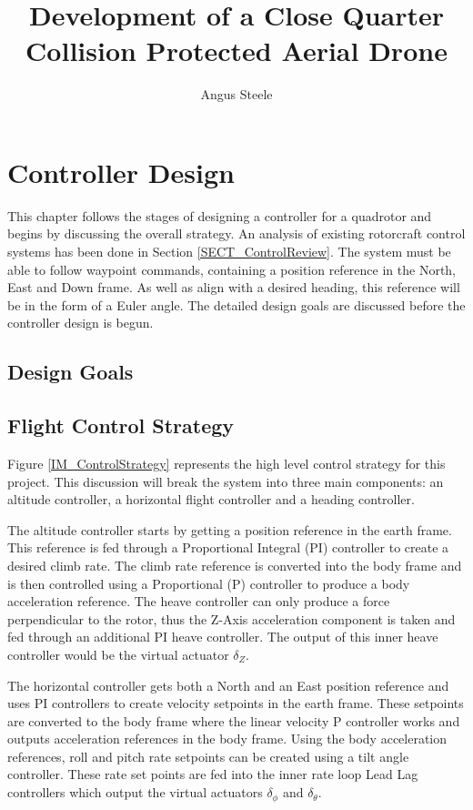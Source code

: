 \documentclass[12pt]{report}
\title{Development of a Close Quarter Collision Protected Aerial Drone}
\author{Angus Steele}
\begin{document}
\chapter{Controller Design}
This chapter follows the stages of designing a controller for a quadrotor and begins by discussing the overall strategy. An analysis of existing rotorcraft control systems has been done in Section \ref{SECT_ControlReview}. The system must be able to follow waypoint commands, containing a position reference in the North, East and Down frame. As well as align with a desired heading, this reference will be in the form of a Euler angle. The detailed design goals are discussed before the controller design is begun.

\section{Design Goals}


\section{Flight Control Strategy}
Figure \ref{IM_ControlStrategy} represents the high level control strategy for this project. This discussion will break the system into three main components: an altitude controller, a horizontal flight controller and a heading controller.	

The altitude controller starts by getting a position reference in the earth frame. This reference is fed through a Proportional Integral (PI) controller to create a desired climb rate. The climb rate reference is converted into the body frame and is then controlled using a Proportional (P) controller to produce a body acceleration reference. The heave controller can only produce a force perpendicular to the rotor, thus the Z-Axis acceleration component is taken and fed through an additional PI heave controller. The output of this inner heave controller would be the virtual actuator $\delta_Z$.

The horizontal controller gets both a North and an East position reference and uses PI controllers to create velocity setpoints in the earth frame. These setpoints are converted to the body frame where the linear velocity P controller works and outputs acceleration references in the body frame. Using the body acceleration references, roll and pitch rate setpoints can be created using a tilt angle controller. These rate set points are fed into the inner rate loop Lead Lag controllers which output the virtual actuators $\delta_\phi$ and $\delta_\theta$.
\end{document}

